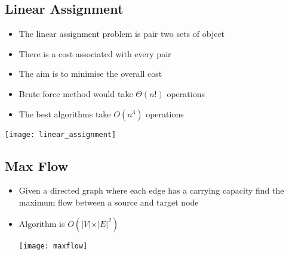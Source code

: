 \begin{slide}
\section[-1]{Linear Assignment}

\begin{minipage}{12cm}
\begin{PauseHighLight}
  \begin{itemize}
  \item The linear assignment problem is pair two sets of object\pause
  \item There is a cost associated with every pair\pause
  \item The aim is to minimise the overall cost\pause
  \item Brute force method would take $\Theta(n!)$ operations\pause
  \item The best algorithms take $O(n^3)$ operations\pause
  \end{itemize}
\end{PauseHighLight}

\end{minipage}\hfill
\begin{minipage}{10cm}
\texttt{[image: linear\_assignment]}
\end{minipage}
\end{slide}


\begin{slide}
\section[-1]{Max Flow}

\begin{PauseHighLight}
  \begin{itemize}
  \item Given a directed graph where each edge has a carrying capacity
    find the maximum flow between a source and target node\pause
  \item Algorithm is $O(\vert V \vert \times \vert E \vert^2)$\pause
  \begin{center}
    \texttt{[image: maxflow]}
  \end{center}
  \end{itemize}
\end{PauseHighLight}

\end{slide}

